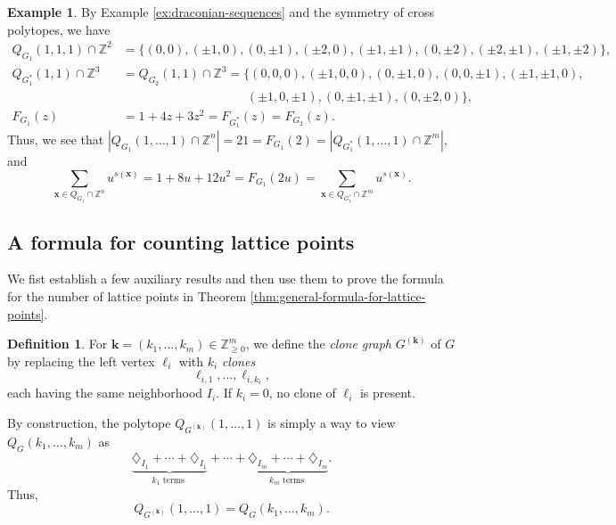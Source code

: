 \documentclass[11pt,a4paper]{article}
\newcommand{\vct}[1]{\boldsymbol{#1}}
\newcommand{\Z}{\mathbb{Z}}
\newcommand{\1}{\mathbf{1}}
\theoremstyle{plain}
\theoremstyle{definition}
\newtheorem{definition}[theorem]{Definition}
\newtheorem{example}[theorem]{Example}
\begin{document}
\begin{example}
    By Example \ref{ex:draconian-sequences} and the symmetry of cross polytopes, we have
    \begin{align*}
        Q_{G_1}(1,1,1)\cap \Z^2 &= \{(0,0), (\pm 1,0),(0,\pm 1),(\pm 2,0),(\pm 1,\pm 1),(0,\pm 2),(\pm 2,\pm 1),(\pm 1,\pm 2)\},\\
        Q_{G_1^*}(1,1)\cap \Z^3&=Q_{G_2}(1,1)\cap \Z^3 = \{(0,0,0), (\pm 1,0,0), (0,\pm 1,0),(0,0,\pm 1),(\pm 1,\pm 1,0),\\
        & \qquad \qquad \qquad\qquad\qquad (\pm 1,0,\pm 1),(0,\pm 1,\pm 1),(0,\pm 2,0)\},\\
        F_{G_1}(z) &= 1+4z+3z^2= F_{G^*_1}(z) = F_{G_2}(z).
    \end{align*}
Thus, we see that $|Q_{G_1}(1,\ldots,1)\cap\Z^n|
= 21 = F_{G_1}(2)= |Q_{G^*_1}(1,\ldots,1)\cap\Z^m| ,$ and
\[\sum_{\vct{x}\in Q_{G_1}\cap\Z^n}u^{s(\vct{x})}
= 1+8u+12u^2  =F_{G_1}(2u) = \sum_{\vct{x}\in Q_{G^*_1}\cap\Z^m}u^{s(\vct{x})}.
\]
\end{example}


\subsection{A formula for counting lattice points}

We fist establish a few auxiliary results and then use them to prove the formula for the number of lattice points in Theorem \ref{thm:general-formula-for-lattice-points}.

\begin{definition}
For $\vct{k}=(k_1,\ldots,k_m)\in\Z_{\ge0}^m$, we define the \emph{clone graph} $G^{(\vct{k})}$ of $G$ by replacing the left vertex $\ell_i$ with $k_i$ \emph{clones}
\[
\ell_{i,1},\ldots,\ell_{i,k_i},
\]
each having the same neighborhood $I_i$. If $k_i=0$, no clone of $\ell_i$ is present.
\end{definition}
By construction, the polytope $Q_{G^{(\vct{k})}}(1,\dots, 1)$ is simply a way to view $Q_{G}(k_1,\dots, k_m)$ as 
\[\underbrace{\diamondsuit_{I_1} + \cdots +\diamondsuit_{I_1}}_{k_1 \text{ terms }} + \cdots + \underbrace{\diamondsuit_{I_m} + \cdots + \diamondsuit_{I_m}}_{k_m \text{ terms }}.\]
Thus,
\begin{equation}
Q_{G^{(\vct{k})}}(1,\ldots,1)
=Q_G(k_1,\ldots,k_m).
\label{eq:clone-Q}
\end{equation}
\end{document}
